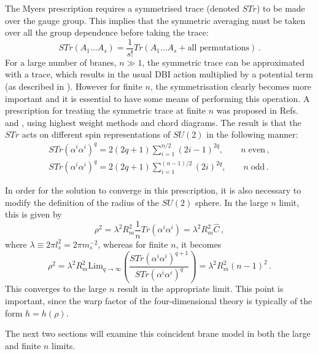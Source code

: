The Myers prescription requires a symmetrised trace (denoted $STr$) to 
be made over the gauge group. This implies that 
the symmetric averaging must be taken over all the group dependence 
before taking the trace:
% 
\begin{equation}
 \label{eq:str-defn-multi}
 STr (A_1 \ldots A_s) = \frac{1}{s!} Tr(A_1 \ldots A_s + \text{all
permutations})\,.
\end{equation}
% 
For a large number of branes, $n \gg 1$, the symmetric trace can be
approximated with a trace, 
which results in the usual DBI action multiplied by a potential term (as
described in \cite{thomasward, Kachru:2002gs}). 
However for finite $n$, the symmetrisation clearly becomes more important and it
is essential to have some means of performing this operation. A prescription for
treating the symmetric trace at finite $n$ was proposed
in Refs.~\cite{Ramgoolam:2004gw} and \cite{McNamara:2005ry}, 
using highest weight methods and chord diagrams. 
% 
The result is that the $STr$ acts on different spin representations of $SU(2)$ 
in the following manner:
% 
\begin{eqnarray}
\label{eq:str-even-multi}
STr (\alpha^i \alpha^i)^q = 2(2q+1)\sum_{i=1}^{n/2}(2i-1)^{2q} , 
\qquad n\; \mathrm{ even}\,, 
\\
\label{eq:str-odd-multi}
STr (\alpha^i \alpha^i)^q = 2(2q+1)\sum_{i=1}^{(n-1)/2} (2i)^{2q} , 
\qquad n\; \mathrm{ odd}\,.
\end{eqnarray}
% 


In order for the solution to converge in this prescription, 
it is also necessary to modify the definition of the radius of the 
$SU(2)$ sphere. In the large $n$ limit, this is given by
% 
\begin{equation}
\label{eq:largen-rho-multi}
\rho^2 = \lambda^2 R_m^2 \frac{1}{n} Tr(\alpha^i \alpha^i) = \lambda^2 R_m^2
\hat{C} \,,
\end{equation}
% 
where $\lambda \equiv 2\pi l_s^2 = 2\pi m_s^{-2}$, 
whereas for finite $n$, it becomes
% 
\begin{equation}
\label{eq:finiten-rho-multi}
\rho^2 = \lambda^2 R_m^2 \mathrm{Lim}_{q \to \infty} \left(\frac{STr (\alpha^i
\alpha^i)^{q+1}}{STr(\alpha^i \alpha^i)^q} \right) 
= \lambda^2 R_m^2 (n-1)^2 \,.
\end{equation}
% 
This converges to the large $n$ result in the appropriate limit.
This point is important, since the warp factor 
of the four-dimensional theory is typically of the form $h= h(\rho)$.

The next two sections will examine this coincident brane model in both the
large and finite $n$ limits. 

